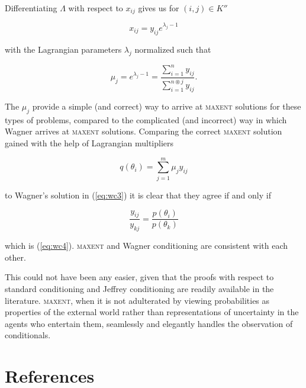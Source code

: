 \documentclass[11pt]{article}
\begin{document}
Differentiating $\Lambda$ with respect to $x_{ij}$ gives us for $(i,j)\in{}K''$

\begin{equation}
  \label{eq:wc5}
  x_{ij}=y_{ij}e^{\lambda_{j}-1}
\end{equation}

with the Lagrangian parameters $\lambda_{j}$ normalized such that

\begin{equation}
  \label{eq:wc6}
  \mu_{j}=e^{\lambda_{j}-1}=\frac{\sum_{i=1}^{n}y_{ij}}{\sum_{i=1}^{n\circledast{}j}y_{ij}}.
\end{equation}

The $\mu_{j}$ provide a simple (and correct) way to arrive at
\textsc{maxent} solutions for these types of problems, compared to the
complicated (and incorrect) way in which Wagner arrives at
\textsc{maxent} solutions. Comparing the correct \textsc{maxent}
solution gained with the help of Lagrangian multipliers

\begin{equation}
  \label{eq:wc7}
  q(\theta_{i})=\sum_{j=1}^{m}\mu_{j}y_{ij}
\end{equation}

to Wagner's solution in (\ref{eq:wc3}) it is clear that they agree if
and only if

\begin{equation}
  \label{eq:wc8}
  \frac{y_{ij}}{y_{kj}}=\frac{p(\theta_{i})}{p(\theta_{k})}
\end{equation}

which is (\ref{eq:wc4}). \textsc{maxent} and Wagner conditioning are
consistent with each other.

This could not have been any easier, given that the proofs with
respect to standard conditioning and Jeffrey conditioning are readily
available in the literature. \textsc{maxent}, when it is not
adulterated by viewing probabilities as properties of the external
world rather than representations of uncertainty in the agents who
entertain them, seamlessly and elegantly handles the observation of
conditionals.

\section{References}
\label{References}

% 


\end{document}
